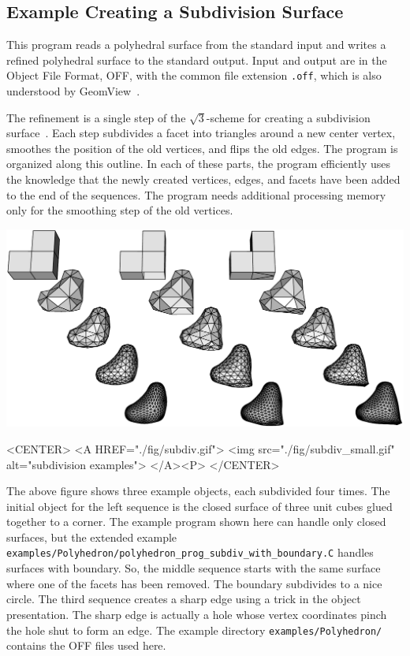 \subsection{Example Creating a Subdivision Surface}

This program reads a polyhedral surface from the standard input and
writes a refined polyhedral surface to the standard output. Input and
output are in the Object File Format, OFF, with the common file
extension {\tt .off}, which is also understood by
GeomView~\cite{cgal:p-gmgv16-96}.

The refinement is a single step of the $\sqrt{3}$-scheme for creating
a subdivision surface~\cite{cgal:k-s-00}. Each step subdivides a facet
into triangles around a new center vertex, smoothes the position of the
old vertices, and flips the old edges. The program is organized along
this outline. In each of these parts, the program efficiently uses the
knowledge that the newly created vertices, edges, and facets have been
added to the end of the sequences. The program needs additional
processing memory only for the smoothing step of the old vertices.

\begin{ccTexOnly}
    \begin{center}
      \parbox{\textwidth}{%
          \includegraphics[width=\textwidth]{Polyhedron/fig/subdiv}%
      }
    \end{center}
\end{ccTexOnly}

\begin{ccHtmlOnly}
    <CENTER>
        <A HREF="./fig/subdiv.gif">
            <img src="./fig/subdiv_small.gif" alt="subdivision examples">
        </A><P>
    </CENTER>
\end{ccHtmlOnly}

The above figure shows three example objects, each 
subdivided four times. The initial object for the left sequence is
the closed surface of three unit cubes glued together to a corner.
The example program shown here can handle only closed surfaces, 
but the extended example
\texttt{examples/Polyhedron/polyhedron\_prog\_subdiv\_with\_boundary.C}
handles surfaces with boundary. So, the middle sequence starts with
the same surface where one of the facets has been removed. The boundary
subdivides to a nice circle. The third sequence creates a sharp
edge using a trick in the object presentation. The sharp edge is 
actually a hole whose vertex coordinates pinch the hole shut to form an
edge. The example directory \texttt{examples/Polyhedron/} contains the 
OFF files used here.

